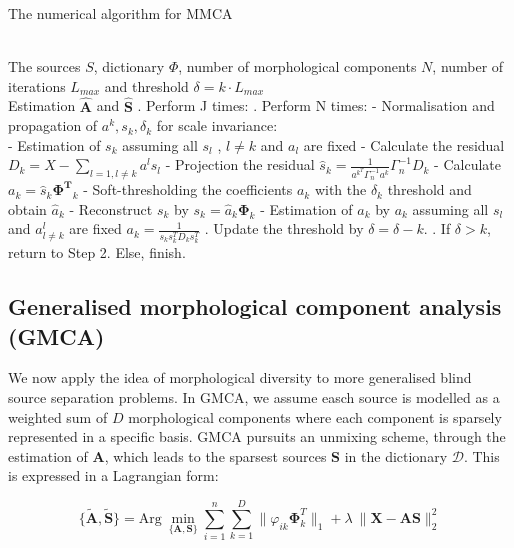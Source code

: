 \begin{algorithm}[!htbp] 
\caption{ The numerical algorithm for MMCA} 
\label{alg:Framwork} 
\begin{algorithmic}
\REQUIRE ~~\\%
The sources $S$, dictionary $\Phi$, number of morphological components $N$, number of iterations $L_{max}$ and threshold $\delta = k \cdot L_{max}$
\ENSURE ~~\\ %
Estimation $\hat{\mathbf{A}}$ and $\hat{\mathbf{S}}$
. Perform J times:
\STATE {}. Perform N times:
\STATE \qquad \quad - Normalisation and propagation of $a^k, s_k, \delta_k$ for scale invariance:\\
\STATE \qquad \quad - Estimation of $s_k$ assuming all $s_l$ , $l\neq k$ and $a_l$ are fixed
\STATE \qquad \quad - Calculate the residual $D_k = X - \sum_{l=1,l\neq k} a^ls_l$
\STATE \qquad \quad - Projection the residual $\hat{s}_k = \frac{1}{a^k^T\Gamma_n^{-1}a^k}\Gamma_n^{-1}D_k$
\STATE \qquad \quad - Calculate $a_k = \hat{s}_k \mathbf{\Phi^T}_k$
\STATE \qquad \quad - Soft-thresholding the coefficients $a_k$ with the $\delta_k$ threshold and obtain $\hat{a}_k$
\STATE \qquad \quad - Reconstruct $s_k$ by $s_k = \hat{a}_k \mathbf{\Phi}_k$
\STATE \qquad \quad - Estimation of $a_k$ by $a_k$ assuming all $s_l$ and $a^l_{l \neq k}$ are fixed $a_k = \frac{1}{s_k s_k^T D_ks_k^T}$
. Update the threshold by $\delta = \delta - k$.
. If $\delta  > k$, return to Step 2. Else, finish.
\end{algorithmic}
\end{algorithm}


\subsection{Generalised morphological component analysis (GMCA)}
We now apply the idea of morphological diversity to more generalised blind source separation problems. In GMCA, we assume easch source is modelled as a weighted sum of $D$ morphological components where each component is sparsely represented in a specific basis.
GMCA pursuits an unmixing scheme, through the estimation of $\mathbf{A}$, which leads to the sparsest sources $\mathbf{S}$ in the dictionary $\mathcal{D}$. This is expressed in a Lagrangian form:

\begin{equation}
    \{\mathbf{\tilde{A},\tilde{S}}\} = \text{Arg} \: \min_{\{\mathbf{A,S}\}} \sum_{i=1}^n \sum_{k=1}^D \lVert\varphi_{ik} \mathbf{\Phi}_k^T \rVert_{1} + \lambda \:\lVert \mathbf{X} - \mathbf{AS} \rVert^2_2
    \label{GMCAequation}
\end{equation}


